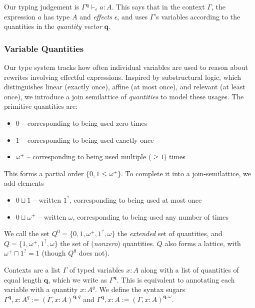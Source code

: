 \documentclass[acmsmall,screen,anonymous,review]{acmart}
\newcommand{\mb}[1]{\ensuremath{\mathbf{#1}}}
\newcommand{\hasty}[4]{#1 \vdash_{#2} #3: {#4}}
\newcommand{\zeroq}{0}
\newcommand{\oneq}{1}
\newcommand{\delq}{1^?}
\newcommand{\cpyq}{\omega^+}
\newcommand{\topq}{\omega}
\begin{document}
Our typing judgement is $\hasty{\Gamma^{\mb{q}}}{\epsilon}{a}{A}$.
This says that in the context $\Gamma$, the expression $a$ has type $A$ and \emph{effects}
$\epsilon$, and uses $\Gamma$'s variables according to the quantities in the
\emph{quantity vector} $\mb{q}$.

\subsubsection{Variable Quantities}

Our type system tracks how often individual variables are used to reason about rewrites
involving effectful expressions. Inspired by substructural logic, which distinguishes linear
(exactly once), affine (at most once), and relevant (at least once), we introduce a join semilattice
of \emph{quantities} to model these usages. The primitive quantities are:
\begin{itemize}
  \item $\zeroq$ -- corresponding to being used zero times
  \item $\oneq$ -- corresponding to being used exactly once
  \item $\cpyq$ -- corresponding to being used multiple ($\geq 1$) times
\end{itemize}
This forms a partial order $\{\zeroq, \oneq \leq \cpyq\}$. To complete it into a join-semilattice, we add elements
\begin{itemize}
  \item $\zeroq \sqcup \oneq$ -- written $\delq$, corresponding to being used at most once
  \item $\zeroq \sqcup \cpyq$ -- written $\topq$, corresponding to being used any number of times
\end{itemize}
We call the set $Q^0 = \{\zeroq, \oneq, \cpyq, \delq, \topq\}$ the \emph{extended} set of
quantities, and $Q = \{\oneq, \cpyq, \delq, \topq\}$ the set of (\emph{nonzero}) quantities. $Q$ also forms a lattice, with $\cpyq \sqcap \delq = \oneq$ (though $Q^0$ does not).

Contexts are a list $\Gamma$ of typed variables $x : A$ along with a list of quantities of equal
length $\mb{q}$, which we write as $\Gamma^{\mb{q}}$. This is equivalent to annotating each variable  with a quantity $x : A^q$. We define the syntax sugars
  $\Gamma^{\mb{q}}, x : A^q := (\Gamma, x : A)^{\mb{q}, q}$ and
  $\Gamma^{\mb{q}}, x : A :=  (\Gamma, x : A)^{\mb{q}, \topq}$.
\end{document}
